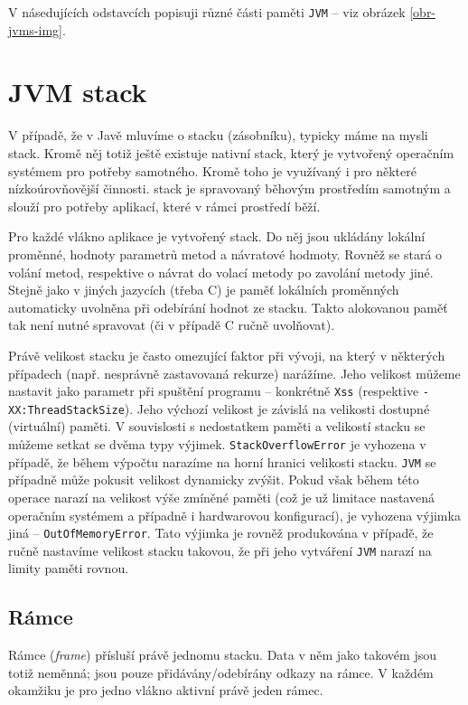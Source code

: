 V násedujících odstavcích popisuji různé části paměti \texttt{JVM} -- viz obrázek \ref{obr-jvms-img}.

\section{JVM stack}
V případě, že v Javě mluvíme o stacku (zásobníku), typicky máme na mysli  stack. Kromě něj totiž ještě existuje nativní stack, který je vytvořený operačním systémem pro potřeby  samotného. Kromě toho je využívaný i pro některé nízkoúrovňovější činnosti.  stack je spravovaný běhovým prostředím samotným a slouží pro potřeby aplikací, které v rámci prostředí běží.

Pro každé vlákno aplikace je vytvořený stack. Do něj jsou ukládány lokální proměnné, hodnoty parametrů metod a návratové hodmoty. Rovněž se stará o volání metod, respektive o návrat do volací metody po zavolání metody jiné. Stejně jako v jiných jazycích (třeba C) je paměť lokálních proměnných automaticky uvolněna při odebírání hodnot ze stacku. Takto alokovanou paměť tak není nutné spravovat  (či v případě C ručně uvolňovat).

Právě velikost  stacku je často omezující faktor při vývoji, na který v některých případech (např. nesprávně zastavovaná rekurze) narážíme. Jeho velikost můžeme nastavit jako parametr při spuštění programu -- konkrétně \texttt{Xss} (respektive \texttt{-XX:ThreadStackSize}). Jeho výchozí velikost je závislá na velikosti dostupné (virtuální) paměti. V souvislosti s nedostatkem paměti a velikostí stacku se můžeme setkat se dvěma typy výjimek. \texttt{StackOverflowError} je vyhozena v případě, že během výpočtu narazíme na horní hranici velikosti stacku. \texttt{JVM} se případně může pokusit velikost dynamicky zvýšit. Pokud však během této operace narazí na velikost výše zmíněné paměti (což je už limitace nastavená operačním systémem a případně i hardwarovou konfigurací), je vyhozena výjimka jiná -- \texttt{OutOfMemoryError}. Tato výjimka je rovněž produkována v případě, že ručně nastavíme velikost stacku takovou, že při jeho vytváření \texttt{JVM} narazí na limity paměti rovnou.

\subsection{Rámce}
Rámce (\textit{frame}) přísluší právě jednomu stacku. Data v něm jako takovém jsou totiž neměnná; jsou pouze přidávány/odebírány odkazy na rámce. V každém okamžiku je pro jedno vlákno aktivní právě jeden rámec. 

